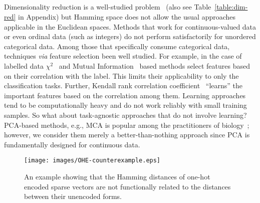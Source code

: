 \subsection{} Dimensionality reduction is a well-studied problem~\cite{plos_categorical_tips} (also see Table~\ref{table:dim-red} in Appendix) but Hamming space does not allow the usual approaches applicable in the Euclidean spaces. Methods that work for continuous-valued data or even ordinal data (such as integers) do not perform satisfactorily for unordered categorical data. Among those that specifically consume categorical data, techniques \textit{via} feature selection  been well studied. For example, in the case of  labelled data $\chi^2$~\cite{chi_square} and {Mutual Information}~\cite{MI} based methods select features based on their correlation with the label. This limits their applicability to only the classification tasks. Further,  {Kendall rank correlation coefficient}~\cite{kendall1938measure} ``learns'' the important features based on the correlation among them. Learning approaches tend to be computationally heavy and do not work reliably with small training samples. So what about task-agnostic approaches that do not involve learning? PCA-based methods, e.g., MCA is popular among the practitioners of biology~\cite{plos_categorical_tips}; however, we consider them merely a better-than-nothing approach since PCA is fundamentally designed for continuous data.

\begin{figure}[!ht]
    \texttt{[image: images/OHE-counterexample.eps]}
    \caption{An example showing that the Hamming distances of one-hot encoded sparse vectors are not functionally related to the distances between their unencoded forms.  \label{fig:ohe-counterexample}}
\end{figure}

